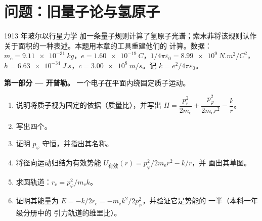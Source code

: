 \section{问题：旧量子论与氢原子}

\begin{problem}\label{pb:b3:hamiltonian-mechanics:1}
1913 年玻尔以行星力学
加一条量子规则计算了氢原子光谱；索末菲将该规则认作
关于面积的一种表述。本题用本章的工具重建他们的
计算。数据：$m_{\text{e}} =
\qty{9.11e-31}{kg}$，$e = \qty{1.60e-19}{C}$，$1/4\pi\varepsilon_0 =
\qty{8.99e9}{N.m^2/C^2}$，$h = \qty{6.63e-34}{J.s}$，$c =
\qty{3.00e8}{m/s}$。记 $k = e^2/4\pi\varepsilon_0$。

\medskip\noindent\textbf{第一部分 --- 开普勒。}
一个电子在平面内绕固定质子运动。
\begin{enumerate}
  \item 说明将质子视为固定的依据（质量比），并写出
         $H = \dfrac{p_r^2}{2m_{\text{e}}} +
        \dfrac{p_\varphi^2}{2m_{\text{e}}r^2} - \dfrac{k}{r}$。
  \item 写出四个。
  \item 证明 $p_\varphi$ 守恒，并指出其名称。
  \item 将径向运动归结为有效势能
        $U_{\text{有效}}(r) = p_\varphi^2/2m_{\text{e}}r^2 - k/r$，并
        画出其草图。
  \item 求圆轨道：$r_{\text{c}} =
        p_\varphi^2/m_{\text{e}}k$。
  \item 证明其能量为 $E = -k/2r_{\text{c}} =
        -m_{\text{e}}k^2/2p_\varphi^2$，并验证它是势能的
        一半（本科一年级分册中的
        引力轨道的维里比）。
\end{enumerate}


\end{problem}
